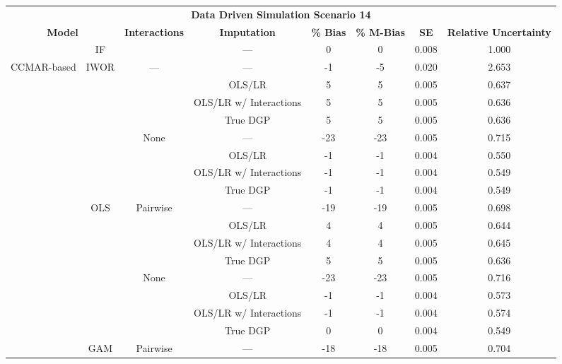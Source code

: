 \begin{table}
\centering
\begin{tabular}[ht]{|>{}c|c|c|c|c|c|c|>{}c|}
\hline
\multicolumn{8}{|c|}{\textbf{Data Driven Simulation Scenario 14}} \\
\cline{1-8}
\multicolumn{2}{|c|}{\textbf{Model}} & \textbf{Interactions} & \textbf{Imputation} & \textbf{\% Bias} & \textbf{\% M-Bias} & \textbf{SE} & \textbf{Relative Uncertainty}\\
\hline
 & IF &  & --- & 0 & 0 & 0.008 & 1.000\\
\cline{2-2}
\cline{4-8}
\multirow{-2}{*}{\centering\arraybackslash CCMAR-based} & IWOR & \multirow{-2}{*}{\centering\arraybackslash ---} & --- & -1 & -5 & 0.020 & 2.653\\
\cline{1-8}
 &  &  & OLS/LR & 5 & 5 & 0.005 & 0.637\\
\cline{4-8}
 &  &  & OLS/LR w/ Interactions & 5 & 5 & 0.005 & 0.636\\
\cline{4-8}
 &  &  & True DGP & 5 & 5 & 0.005 & 0.636\\
\cline{4-8}
 &  & \multirow{-4}{*}{\centering\arraybackslash None} & --- & -23 & -23 & 0.005 & 0.715\\
\cline{3-8}
 &  &  & OLS/LR & -1 & -1 & 0.004 & 0.550\\
\cline{4-8}
 &  &  & OLS/LR w/ Interactions & -1 & -1 & 0.004 & 0.549\\
\cline{4-8}
 &  &  & True DGP & -1 & -1 & 0.004 & 0.549\\
\cline{4-8}
 & \multirow{-8}{*}{\centering\arraybackslash OLS} & \multirow{-4}{*}{\centering\arraybackslash Pairwise} & --- & -19 & -19 & 0.005 & 0.698\\
\cline{2-8}
 &  &  & OLS/LR & 4 & 4 & 0.005 & 0.644\\
\cline{4-8}
 &  &  & OLS/LR w/ Interactions & 4 & 4 & 0.005 & 0.645\\
\cline{4-8}
 &  &  & True DGP & 5 & 5 & 0.005 & 0.636\\
\cline{4-8}
 &  & \multirow{-4}{*}{\centering\arraybackslash None} & --- & -23 & -23 & 0.005 & 0.716\\
\cline{3-8}
 &  &  & OLS/LR & -1 & -1 & 0.004 & 0.573\\
\cline{4-8}
 &  &  & OLS/LR w/ Interactions & -1 & -1 & 0.004 & 0.574\\
\cline{4-8}
 &  &  & True DGP & 0 & 0 & 0.004 & 0.549\\
\cline{4-8}
 & \multirow{-8}{*}{\centering\arraybackslash GAM} & \multirow{-4}{*}{\centering\arraybackslash Pairwise} & --- & -18 & -18 & 0.005 & 0.704\\

\end{tabular}
\end{table}

